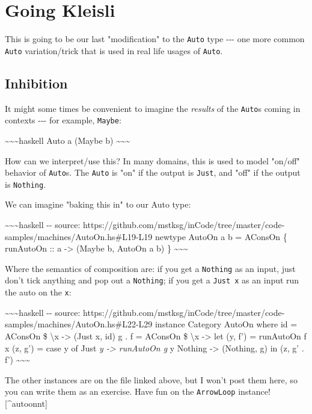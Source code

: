 \documentclass[]{article}
\begin{document}
\section{Going Kleisli}

This is going to be our last "modification" to the \texttt{Auto} type -\/-\/-
one more common \texttt{Auto} variation/trick that is used in real life usages
of \texttt{Auto}.

\subsection{Inhibition}

It might some times be convenient to imagine the \emph{results} of the
\texttt{Auto}s coming in contexts -\/-\/- for example, \texttt{Maybe}:

\textasciitilde{}\textasciitilde{}\textasciitilde{}haskell Auto a (Maybe b)
\textasciitilde{}\textasciitilde{}\textasciitilde{}

How can we interpret/use this? In many domains, this is used to model "on/off"
behavior of \texttt{Auto}s. The \texttt{Auto} is "on" if the output is
\texttt{Just}, and "off" if the output is \texttt{Nothing}.

We can imagine "baking this in" to our Auto type:

\textasciitilde{}\textasciitilde{}\textasciitilde{}haskell -\/- source:
https://github.com/mstksg/inCode/tree/master/code-samples/machines/AutoOn.hs\#L19-L19
newtype AutoOn a b = AConsOn \{ runAutoOn :: a -\textgreater{} (Maybe b, AutoOn
a b) \} \textasciitilde{}\textasciitilde{}\textasciitilde{}

Where the semantics of composition are: if you get a \texttt{Nothing} as an
input, just don't tick anything and pop out a \texttt{Nothing}; if you get a
\texttt{Just\ x} as an input run the auto on the \texttt{x}:

\textasciitilde{}\textasciitilde{}\textasciitilde{}haskell -\/- source:
https://github.com/mstksg/inCode/tree/master/code-samples/machines/AutoOn.hs\#L22-L29
instance Category AutoOn where id = AConsOn \$ \textbackslash{}x -\textgreater{}
(Just x, id) g . f = AConsOn \$ \textbackslash{}x -\textgreater{} let (y, f') =
runAutoOn f x (z, g') = case y of Just \emph{y -\textgreater{} runAutoOn g }y
Nothing -\textgreater{} (Nothing, g) in (z, g' . f')
\textasciitilde{}\textasciitilde{}\textasciitilde{}

The other instances are on the file linked above, but I won't post them here, so
you can write them as an exercise. Have fun on the \texttt{ArrowLoop}
instance!{[}\^{}autoonnt{]}
\end{document}
